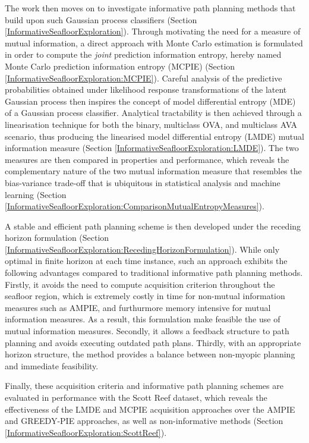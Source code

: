 	The work then moves on to investigate informative path planning methods that build upon such Gaussian process classifiers (Section \ref{InformativeSeafloorExploration}). Through motivating the need for a measure of mutual information, a direct approach with Monte Carlo estimation is formulated in order to compute the \textit{joint} prediction information entropy, hereby named Monte Carlo prediction information entropy (MCPIE) (Section \ref{InformativeSeafloorExploration:MCPIE}). Careful analysis of the predictive probabilities obtained under likelihood response transformations of the latent Gaussian process then inspires the concept of model differential entropy (MDE) of a Gaussian process classifier. Analytical tractability is then achieved through a linearisation technique for both the binary, multiclass OVA, and multiclass AVA scenario, thus producing the linearised model differential entropy (LMDE) mutual information measure (Section \ref{InformativeSeafloorExploration:LMDE}). The two measures are then compared in properties and performance, which reveals the complementary nature of the two mutual information measure that resembles the bias-variance trade-off that is ubiquitous in statistical analysis and machine learning (Section \ref{InformativeSeafloorExploration:ComparisonMutualEntropyMeasures}).
	
	A stable and efficient path planning scheme is then developed under the receding horizon formulation (Section \ref{InformativeSeafloorExploration:RecedingHorizonFormulation}). While only optimal in finite horizon at each time instance, such an approach exhibits the following advantages compared to traditional informative path planning methods. Firstly, it avoids the need to compute acquisition criterion throughout the seafloor region, which is extremely costly in time for non-mutual information measures such as AMPIE, and furthurmore memory intensive for mutual information measures. As a result, this formulation make feasible the use of mutual information measures. Secondly, it allows a feedback structure to path planning and avoids executing outdated path plans. Thirdly, with an appropriate horizon structure, the method provides a balance between non-myopic planning and immediate feasibility.
	
	Finally, these acquisition criteria and informative path planning schemes are evaluated in performance with the Scott Reef dataset, which reveals the effectiveness of the LMDE and MCPIE acquisition approaches over the AMPIE and GREEDY-PIE approaches, as well as non-informative methods (Section \ref{InformativeSeafloorExploration:ScottReef}).
	
